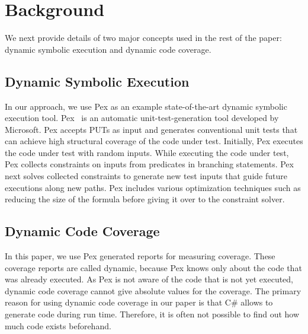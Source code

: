 \section{Background}
\label{sec:background}

We next provide details of two major concepts used in the rest of
the paper: dynamic symbolic execution and dynamic code coverage.

\subsection{Dynamic Symbolic Execution}

In our approach, we use Pex as an example state-of-the-art dynamic symbolic 
execution tool. Pex~\cite{tillman:pexwhite} is an automatic unit-test-generation 
tool developed by Microsoft. Pex accepts PUTs as input and generates conventional 
unit tests that can achieve high 
structural coverage of the code under test. Initially, Pex
executes the code under test with random inputs. While executing
the code under test, Pex collects constraints on inputs from predicates
in branching statements. Pex next solves collected constraints
to generate new test inputs that guide future executions along
new paths. Pex includes various optimization techniques such as
reducing the size of the formula before giving it over to the constraint solver.

\subsection{Dynamic Code Coverage}

In this paper, we use Pex generated reports for measuring coverage. These coverage
reports are called dynamic, because Pex knows only about the code that was already executed.
As Pex is not aware of the code that is not yet executed, dynamic code coverage
cannot give absolute values for the coverage. The primary reason for using
dynamic code coverage in our paper is that C\# allows to generate code during run time.
Therefore, it is often not possible to find out how much code exists beforehand.